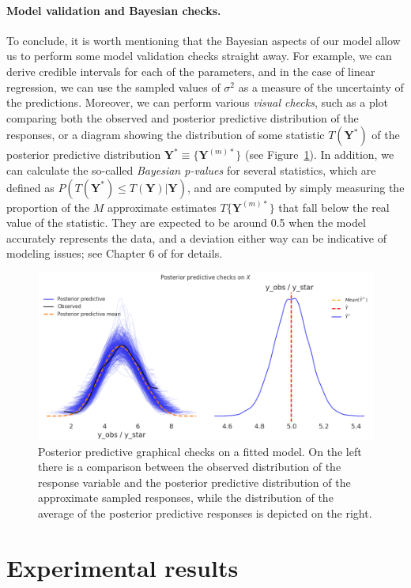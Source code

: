 \documentclass[ba]{imsart}
\numberwithin{equation}{section}
\theoremstyle{plain}
\begin{document}
\paragraph{Model validation and Bayesian checks.} To conclude, it is worth mentioning that the Bayesian aspects of our model allow us to perform some model validation checks straight away. For example, we can derive credible intervals for each of the parameters, and in the case of linear regression, we can use the sampled values of \(\sigma^2\) as a measure of the uncertainty of the predictions. Moreover, we can perform various \textit{visual checks}, such as a plot comparing both the observed and posterior predictive distribution of the responses, or a diagram showing the distribution of some statistic \(T(\bm Y^*)\) of the posterior predictive distribution \(\bm Y^* \equiv \{\bm Y^{(m)*}\}\) (see Figure~\ref{fig:ppc}). In addition, we can calculate the so-called \textit{Bayesian p-values} for several statistics, which are defined as \(P(T(\bm Y^*)\leq T(\bm Y)| \bm Y)\), and are computed by simply measuring the proportion of the \(M\) approximate estimates \(T\{\bm Y^{(m)*}\}\) that fall below the real value of the statistic. They are expected to be around 0.5 when the model accurately represents the data, and a deviation either way can be indicative of modeling issues; see Chapter 6 of \citet{gelman2013bayesian} for details.

\begin{figure}[ht]
  \centering
  \includegraphics[width=.75\textwidth]{img/ppc_linear}
  \caption{Posterior predictive graphical checks on a fitted model. On the left there is a comparison between the observed distribution of the response variable and the posterior predictive distribution of the approximate sampled responses, while the distribution of the average of the posterior predictive responses is depicted on the right.}\label{fig:ppc}
\end{figure}

\section{Experimental results}\label{sec:results}
\end{document}
